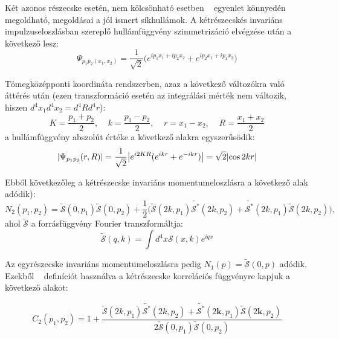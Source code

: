 \documentclass[11pt,a4paper]{article}
\numberwithin{equation}{subsection}
\numberwithin{figure}{section}
\begin{document}
Két azonos részecske esetén, nem kölcsönható esetben ~ egyenlet könnyedén megoldható, megoldásai a jól
ismert síkhullámok. A kétrészecskés invariáns impulzuseloszlásban szereplő hullámfüggvény szimmetrizáció
elvégzése után a következő lesz:
\begin{equation}
\Psi_{{p_1}{p_2}({x_1},{x_2})} = \frac{1}{\sqrt{2}}\big({e^{{ip_1x_1}+i{p_2x_2}}+e^{i{p_2x_1}+i{p_1x_2}}}\big)
\end{equation}

Tömegközépponti koordináta rendszerben, azaz a következő változókra való áttérés után (ezen transzformáció esetén az integrálási mérték nem változik, hiszen $d^4x_1d^4x_2=d^4Rd^4r$):
\begin{equation}
{K}=\frac{p_1+p_2}{2},\;\;\;\;{k}=\frac{{p_1-p_2}}{2},\;\;\;\;{r}={x_1-x_2},\;\;\;\;{R}=\frac{{x_1+x_2}}{2}
\label{eq:CMF}
\end{equation}
\noindent
a hullámfüggvény abszolút értéke a következő alakra egyszerűsödik:
\begin{equation}
\abs{\Psi_{{p_1}{p_2}}({r},{R})} = \frac{1}{\sqrt{2}}\abs{e^{i{2KR}}(e^{i{kr}}+e^{-i{kr}})}=\sqrt{2}\abs{\cos{2{kr}}}
\end{equation}

Ebből következőleg a kétrészecske invariáns momentumeloszlásra a következő alak adódik):
\begin{equation}
N_2({p_1},{p_2})=\tilde{\mathcal{S}}(0, {p_1})\tilde{\mathcal{S}}(0, {p_2})+\frac{1}{2}\big(\tilde{\mathcal{S}}(2{k}, {p_1})\tilde{\mathcal{S^*}}(2{k}, {p_2})+\tilde{\mathcal{S^*}}(2{k},{ p_1})\tilde{\mathcal{S}}(2{k}, {p_2})\big),
\end{equation}
\noindent
ahol $\tilde{\mathcal{S}}$ a forrásfüggvény Fourier transzformáltja:
\begin{equation}
\tilde{\mathcal{S}}({q}, {k})=\int d^4x\mathcal{S}(x,k)e^{i{qx}}
\end{equation}

Az egyrészecske invariáns momentumeloszlásra pedig $N_1({p})=\tilde{\mathcal{S}}(0, {p})$ adódik. Ezekből ~ definíciót használva a kétrészecske korrelációs függvényre kapjuk a következő alakot:

\begin{equation}
C_2({p_1},{p_2}) = 1+ \frac{\tilde{\mathcal{S}}(2{k}, {p_1})\tilde{\mathcal{S^*}}(2{k}, {p_2})+\tilde{\mathcal{S^*}}(2\bm{k},{ p_1})\tilde{\mathcal{S}}(2\bm{k}, {p_2})}{2\tilde{\mathcal{S}}(0, {p_1})\tilde{\mathcal{S}}(0, {p_2})}
\end{equation}
\end{document}
